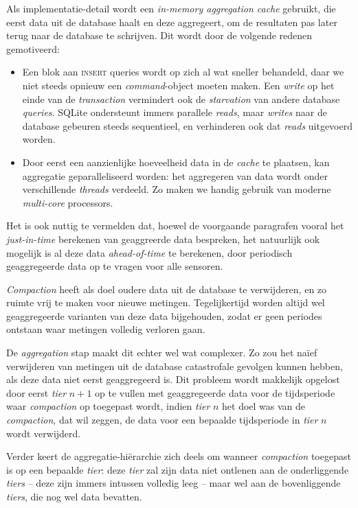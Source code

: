 \documentclass[12pt,parskip=full]{article}
\begin{document}
Als implementatie-detail wordt een \emph{in-memory aggregation cache} gebruikt, die eerst data uit de database haalt en deze aggregeert, om de resultaten pas later terug naar de database te schrijven. Dit wordt door de volgende redenen gemotiveerd:

\begin{itemize}
	\item Een blok aan \textsc{insert} queries wordt op zich al wat sneller behandeld, daar we niet steeds opnieuw een \emph{command}-object moeten maken. Een \emph{write} op het einde van de \emph{transaction} vermindert ook de \emph{starvation} van andere database \emph{queries}. SQLite ondersteunt immers parallele \emph{reads}, maar \emph{writes} naar de database gebeuren steeds sequentieel, en verhinderen ook dat \emph{reads} uitgevoerd worden.

	\item Door eerst een aanzienlijke hoeveelheid data in de \emph{cache} te plaatsen, kan aggregatie geparalleliseerd worden: het aggregeren van data wordt onder verschillende \emph{threads} verdeeld. Zo maken we handig gebruik van moderne \emph{multi-core} processors.
\end{itemize}

Het is ook nuttig te vermelden dat, hoewel de voorgaande paragrafen vooral het \emph{just-in-time} berekenen van geaggreerde data bespreken, het natuurlijk ook mogelijk is al deze data \emph{ahead-of-time} te berekenen, door periodisch geaggregeerde data op te vragen voor alle sensoren.

\emph{Compaction} heeft als doel oudere data uit de database te verwijderen, en zo ruimte vrij te maken voor nieuwe metingen. Tegelijkertijd worden altijd wel geaggregeerde varianten van deze data bijgehouden, zodat er geen periodes ontstaan waar metingen volledig verloren gaan.

De \emph{aggregation} stap maakt dit echter wel wat complexer. Zo zou het na\"ief verwijderen van metingen uit de database catastrofale gevolgen kunnen hebben, als deze data niet eerst geaggregeerd is. Dit probleem wordt makkelijk opgelost door eerst \emph{tier} $n + 1$ op te vullen met geaggregeerde data voor de tijdsperiode waar \emph{compaction} op toegepast wordt, indien \emph{tier} $n$ het doel was van de \emph{compaction}, dat wil zeggen, de data voor een bepaalde tijdsperiode in \emph{tier} $n$ wordt verwijderd.

Verder keert de aggregatie-hi\"erarchie zich deels om wanneer \emph{compaction} toegepast is op een bepaalde \emph{tier}: deze \emph{tier} zal zijn data niet ontlenen aan de onderliggende \emph{tiers} -- deze zijn immers intussen volledig leeg -- maar wel aan de bovenliggende \emph{tiers}, die nog wel data bevatten.
\end{document}
